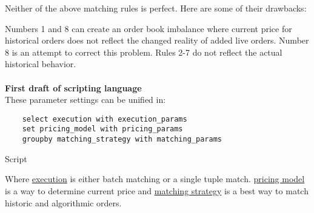 \documentclass[11pt]{article}
\begin{document}
Neither of the above matching rules is perfect. Here are some of their drawbacks:

Numbers 1 and 8 can create an order book imbalance where current price for historical orders does not reflect the changed reality of added live orders. Number 8 is an attempt to correct this problem. Rules 2-7 do not reflect the actual historical behavior. 
\\
\\
{\bf First draft of scripting language}
\\
These parameter settings can be unified in:
\begin{program}
    \begin{verbatim}
    select execution with execution_params
    set pricing_model with pricing_params
    groupby matching_strategy with matching_params
    \end{verbatim}
    \caption{Script}
\end{program}  

Where \underline{execution} is either batch matching or a single tuple match. \underline{pricing model} is a way to determine current price and \underline{matching strategy} is a best way to match historic and algorithmic orders.
\end{document}
